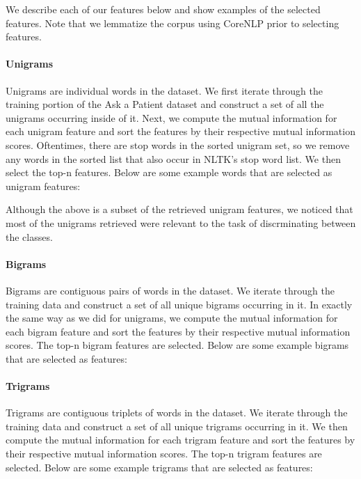 \documentclass{acm_proc_article-sp}
\begin{document}
We describe each of our features below and show examples of the selected features. Note that we lemmatize the corpus using CoreNLP prior to selecting features.

\paragraph{Unigrams}
Unigrams are individual words in the dataset. We first iterate through the training portion of the Ask a Patient dataset and construct a set of all the unigrams occurring inside of it. Next, we compute the mutual information for each unigram feature and sort the features by their respective mutual information scores. Oftentimes, there are stop words in the sorted unigram set, so we remove any words in the sorted list that also occur in NLTK's stop word list. We then select the top-n features. Below are some example words that are selected as unigram features: 

\noindent{} 

Although the above is a subset of the retrieved unigram features, we noticed that most of the unigrams retrieved were relevant to the task of  discrminating between the classes.

\paragraph{Bigrams}
Bigrams are contiguous pairs of words in the dataset. We iterate through the training data and construct a set of all unique bigrams occurring in it. In exactly the same way as we did for unigrams, we compute the mutual information for each bigram feature and sort the features by their respective mutual information scores. The top-n bigram features are selected. Below are some example bigrams that are selected as features:

\noindent{}

\paragraph{Trigrams}
Trigrams are contiguous triplets of words in the dataset. We iterate through the training data and construct a set of all unique trigrams occurring in it. We then compute the mutual information for each trigram feature and sort the features by their respective mutual information scores. The top-n trigram features are selected. Below are some example trigrams that are selected as features:
\end{document}
